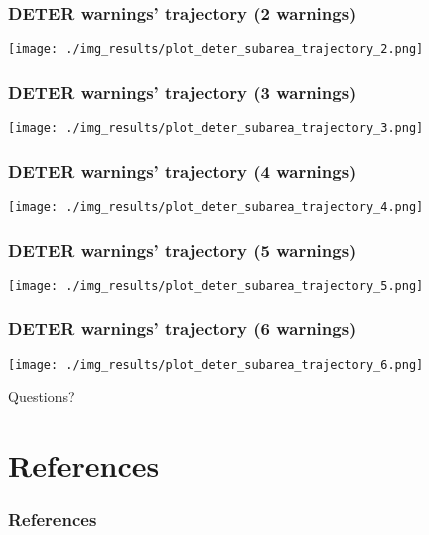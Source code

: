 \documentclass{beamer}
\begin{document}
\begin{frame}
    \frametitle{DETER warnings' trajectory (2 warnings) }
    \texttt{[image: ./img\_results/plot\_deter\_subarea\_trajectory\_2.png]}
\end{frame}

\begin{frame}
    \frametitle{DETER warnings' trajectory (3 warnings) }
    \texttt{[image: ./img\_results/plot\_deter\_subarea\_trajectory\_3.png]}
\end{frame}

\begin{frame}
    \frametitle{DETER warnings' trajectory (4 warnings) }
    \texttt{[image: ./img\_results/plot\_deter\_subarea\_trajectory\_4.png]}
\end{frame}

\begin{frame}
    \frametitle{DETER warnings' trajectory (5 warnings) }
    \texttt{[image: ./img\_results/plot\_deter\_subarea\_trajectory\_5.png]}
\end{frame}

\begin{frame}
    \frametitle{DETER warnings' trajectory (6 warnings) }
    \texttt{[image: ./img\_results/plot\_deter\_subarea\_trajectory\_6.png]}
\end{frame}



\begin{frame}
    Questions?
\end{frame}




\section{References}

\begin{frame}[t, allowframebreaks]
    \frametitle{References}
    
    
\end{frame}
\end{document}
